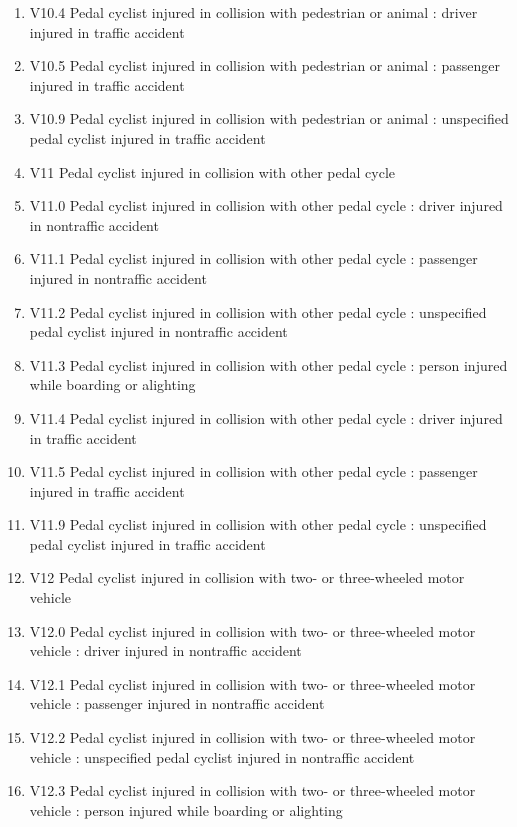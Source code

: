 \documentclass[
]{scrartcl}
\begin{document}
\begin{itemize}
\begin{enumerate}
  \item
    V10.4 Pedal cyclist injured in collision with pedestrian or animal :
    driver injured in traffic accident
  \item
    V10.5 Pedal cyclist injured in collision with pedestrian or animal :
    passenger injured in traffic accident
  \item
    V10.9 Pedal cyclist injured in collision with pedestrian or animal :
    unspecified pedal cyclist injured in traffic accident
  \item
    V11 Pedal cyclist injured in collision with other pedal cycle
  \item
    V11.0 Pedal cyclist injured in collision with other pedal cycle :
    driver injured in nontraffic accident
  \item
    V11.1 Pedal cyclist injured in collision with other pedal cycle :
    passenger injured in nontraffic accident
  \item
    V11.2 Pedal cyclist injured in collision with other pedal cycle :
    unspecified pedal cyclist injured in nontraffic accident
  \item
    V11.3 Pedal cyclist injured in collision with other pedal cycle :
    person injured while boarding or alighting
  \item
    V11.4 Pedal cyclist injured in collision with other pedal cycle :
    driver injured in traffic accident
  \item
    V11.5 Pedal cyclist injured in collision with other pedal cycle :
    passenger injured in traffic accident
  \item
    V11.9 Pedal cyclist injured in collision with other pedal cycle :
    unspecified pedal cyclist injured in traffic accident
  \item
    V12 Pedal cyclist injured in collision with two- or three-wheeled
    motor vehicle
  \item
    V12.0 Pedal cyclist injured in collision with two- or three-wheeled
    motor vehicle : driver injured in nontraffic accident
  \item
    V12.1 Pedal cyclist injured in collision with two- or three-wheeled
    motor vehicle : passenger injured in nontraffic accident
  \item
    V12.2 Pedal cyclist injured in collision with two- or three-wheeled
    motor vehicle : unspecified pedal cyclist injured in nontraffic
    accident
  \item
    V12.3 Pedal cyclist injured in collision with two- or three-wheeled
    motor vehicle : person injured while boarding or alighting

\end{enumerate}
\end{itemize}
\end{document}

